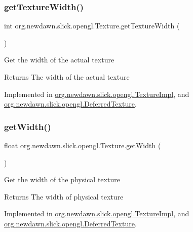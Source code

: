 \subsubsection{\texorpdfstring{get\+Texture\+Width()}{getTextureWidth()}}
{\footnotesize\ttfamily int org.\+newdawn.\+slick.\+opengl.\+Texture.\+get\+Texture\+Width (\begin{DoxyParamCaption}{ }\end{DoxyParamCaption})}

Get the width of the actual texture

\begin{DoxyReturn}{Returns}
The width of the actual texture 
\end{DoxyReturn}


Implemented in \mbox{\hyperlink{classorg_1_1newdawn_1_1slick_1_1opengl_1_1_texture_impl_ae9bf8c9b58a352669c669208093c0d15}{org.\+newdawn.\+slick.\+opengl.\+Texture\+Impl}}, and \mbox{\hyperlink{classorg_1_1newdawn_1_1slick_1_1opengl_1_1_deferred_texture_a19bab2bbecdeb116a7dfeb28d4d04fd6}{org.\+newdawn.\+slick.\+opengl.\+Deferred\+Texture}}.

\mbox{\label{interfaceorg_1_1newdawn_1_1slick_1_1opengl_1_1_texture_a9a4e474e98451e2fe3cf5bedc8fc5910}} 
\subsubsection{\texorpdfstring{get\+Width()}{getWidth()}}
{\footnotesize\ttfamily float org.\+newdawn.\+slick.\+opengl.\+Texture.\+get\+Width (\begin{DoxyParamCaption}{ }\end{DoxyParamCaption})}

Get the width of the physical texture

\begin{DoxyReturn}{Returns}
The width of physical texture 
\end{DoxyReturn}


Implemented in \mbox{\hyperlink{classorg_1_1newdawn_1_1slick_1_1opengl_1_1_texture_impl_afd6ce11ac31f73cd143d6f609a4358f4}{org.\+newdawn.\+slick.\+opengl.\+Texture\+Impl}}, and \mbox{\hyperlink{classorg_1_1newdawn_1_1slick_1_1opengl_1_1_deferred_texture_ac918a8f070b5a122ce8a5f1542c8f342}{org.\+newdawn.\+slick.\+opengl.\+Deferred\+Texture}}.

